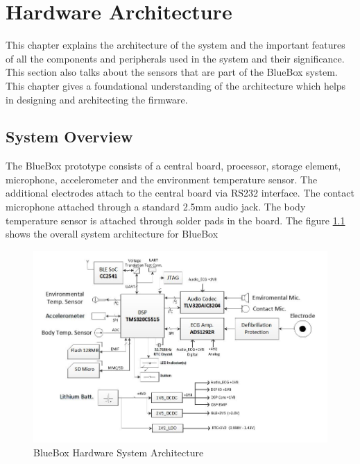 \chapter{Hardware Architecture}
This chapter explains the architecture of the system and the important features of all the components and peripherals used in the system and their significance. This section also talks about the sensors that are part of the BlueBox system. This chapter gives a foundational understanding of the architecture which helps in designing and architecting the firmware.

\section{System Overview}
The BlueBox prototype consists of a central board, processor, storage element, microphone, accelerometer and the environment temperature sensor. The additional electrodes attach to the central board via RS232 interface. The contact microphone attached through a standard 2.5mm audio jack. The body temperature sensor is attached through solder pads in the board. 
The figure \ref{BlueBox_Architecture} shows the overall system architecture for BlueBox
\begin{figure}[h]
	\centering
	\includegraphics[scale = 0.75 ]{BlueBox_Architecture.JPG}
	\caption{BlueBox Hardware System Architecture\label{BlueBox_Architecture}}
\end{figure} 


